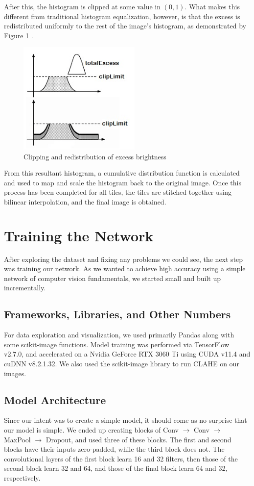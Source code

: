 \documentclass[10pt,twocolumn,letterpaper]{article}
\begin{document}
After this, the histogram is clipped at some value in $(0, 1)$. What makes this different from traditional histogram equalization, however, is that the excess is redistributed uniformly to the rest of the image's histogram, as demonstrated by Figure \ref{fig:clahe2} \cite{clahe}. 

\begin{figure}[h]
\includegraphics[width=6cm]{clahe-step-2}
\centering
\caption{Clipping and redistribution of excess brightness \cite{clahe}}
\label{fig:clahe2}
\end{figure}

From this resultant histogram, a cumulative distribution function is calculated and used to map and scale the histogram back to the original image. Once this process has been completed for all tiles, the tiles are stitched together using bilinear interpolation, and the final image is obtained. 

\section{Training the Network} 
After exploring the dataset and fixing any problems we could see, the next step was training our network. As we wanted to achieve high accuracy using a simple network of computer vision fundamentals, we started small and built up incrementally. 

\subsection{Frameworks, Libraries, and Other Numbers}
For data exploration and visualization, we used primarily Pandas along with some  scikit-image \cite{scikit-image} functions. Model training was performed via TensorFlow v2.7.0, and accelerated on a Nvidia GeForce RTX 3060 Ti using CUDA v11.4 and cuDNN v8.2.1.32. We also used the scikit-image library to run CLAHE on our images. 

\subsection{Model Architecture}
Since our intent was to create a simple model, it should come as no surprise that  our model is simple. We ended up creating blocks of Conv $\rightarrow$ Conv $\rightarrow$ MaxPool $\rightarrow$ Dropout, and used three of these blocks. The first and second blocks have their inputs zero-padded, while the third block does not. The convolutional layers of the first block learn 16 and 32 filters, then those of the second block learn 32 and 64, and those of the final block learn 64 and 32, respectively. 
\end{document}
